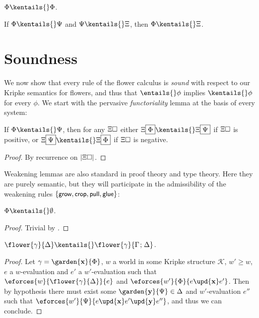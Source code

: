 \begin{fact}[Reflexivity]
  $\Phi \kentails{}\Phi$.
\end{fact}

\begin{fact}[Transitivity]
  If $\Phi \kentails{}\Psi$ and $\Psi \kentails{}\Xi$, then $\Phi \kentails{}\Xi$.
\end{fact}


\section{Soundness}

We now show that every rule of the flower calculus is \emph{sound} with respect
to our Kripke semantics for flowers, and thus that $\entails{} \phi$ implies
$\kentails{}\phi$ for every $\phi$. We start with the pervasive
\emph{functoriality} lemma at the basis of every 
system:

\begin{lemma}[Functoriality] If $\Phi \kentails{}
  \Psi$, then for any $\Xi\square$ either $\Xi\select{\Phi} \kentails{}
  \Xi\select{\Psi}$ if $\Xi\square$ is positive, or $\Xi\select{\Psi} \kentails{}
  \Xi\select{\Phi}$ if $\Xi\square$ is negative.
\end{lemma}
\begin{proof}
  By recurrence on $\left|\Xi\square\right|$.
\end{proof}

Weakening lemmas are also standard in proof theory and type theory. Here they
are purely semantic, but they will participate in the admissibility of the
weakening rules $\{\text{\small$\mathsf{grow}$},\text{\small$\mathsf{crop}$},\text{\small$\mathsf{pull}$},\text{\small$\mathsf{glue}$}\}$:

\begin{lemma}[Weakening]
  $\Phi \kentails{}\emptyset$.
\end{lemma}
\begin{proof}
  Trivial by .
\end{proof}

\begin{lemma}[Co-weakening]
  $\flower{\gamma}{\Delta} \kentails{}\flower{\gamma}{\Gamma \sep \Delta}$.
\end{lemma}
\begin{proof}
  Let $\gamma = \garden{\bx}{\Phi}$, $w$ a world in some Kripke structure
  $\mathcal{K}$, $w' \geq w$, $e$ a $w$-evaluation and $e'$ a $w'$-evaluation
  such that $\eforces{w}{\flower{\gamma}{\Delta}}{e}$ and $\eforces{w'}{\Phi}{e
  \upd{\bx} e'}$. Then by hypothesis there must exist some $\garden{\by}{\Psi}
  \in \Delta$ and $w'$-evaluation $e''$ such that $\eforces{w'}{\Psi}{e
  \upd{\bx} e' \upd{\by} e''}$, and thus we can conclude.
\end{proof}

